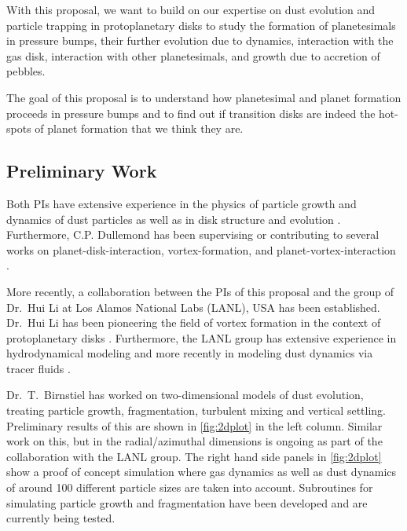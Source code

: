 \documentclass[10pt,fleqn,twoside]{article}
\begin{document}
With this proposal, we want to build on our expertise on dust
evolution and particle trapping in protoplanetary disks to study the
formation of planetesimals in pressure bumps, their further
evolution due to dynamics, interaction with the gas disk,
interaction with other planetesimals, and growth due to accretion of
pebbles.

\begin{highlight}
The goal of this proposal is to understand how planetesimal
and planet formation proceeds in pressure bumps and to find out
if transition disks are indeed the hot-spots of planet formation that
we think they are.
\end{highlight}

\subsection*{Preliminary Work}

Both PIs have extensive experience in the physics of particle growth
and dynamics of dust particles \citep[e..g][see
\citealp{2016SSRv..tmp...32B} for a recent
review]{2005A&A...434..971D, 2008A&A...480..859B, 2008A&A...489..931Z,
2010A&A...513A..79B, 2012A&A...539A.148B, 2014A&A...572A..78D} as well
as in disk structure and evolution \citep[e.g.,][and many
others]{2001ApJ...560..957D, 2002A&A...389..464D, 2004A&A...417..159D,
2010ARA&A..48..205D,2015ApJ...813L..14B}. Furthermore, C.P. Dullemond
has been supervising or contributing to several works on
planet-disk-interaction, vortex-formation, and
planet-vortex-interaction
\citep{2012MNRAS.419.1701R,2013A&A...553L...3A,2014A&A...572A..61A}.

More recently, a collaboration between the PIs of this proposal and
the group of Dr.\ Hui Li at Los Alamos National Labs (LANL), USA has
been established. Dr.\ Hui Li has been pioneering the field of
vortex formation in the context of protoplanetary disks
\citep{2001ApJ...551..874L,2000ApJ...533.1023L}. Furthermore, the LANL
group has extensive experience in hydrodynamical modeling and more
recently in modeling dust dynamics via tracer fluids
\citep[e.g.,][]{2014ApJ...795L..39F,2016ApJ...818...76J}.

Dr.\ T.\ Birnstiel has worked on two-dimensional models of dust
evolution, treating particle growth, fragmentation, turbulent mixing
and vertical settling. Preliminary results of this are shown in
\cref{fig:2dplot} in the left column. Similar work on this, but in the
radial/azimuthal dimensions is ongoing as part of the collaboration
with the LANL group. The right hand side panels in \cref{fig:2dplot}
show a proof of concept simulation where gas dynamics as well as dust
dynamics of around 100 different particle sizes are taken into
account. Subroutines for simulating particle growth and fragmentation
have been developed and are currently being tested.
\end{document}
